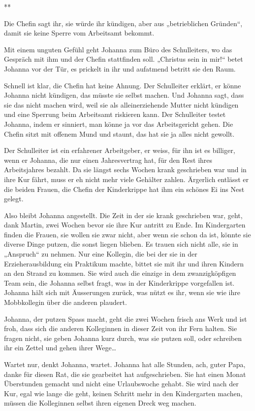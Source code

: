 \documentclass[10pt,titlepage,a5paper]{book}
\newcommand{\sterne}{\par{\centering ***\par}}
\begin{document}
\sterne

Die Chefin sagt ihr, sie würde ihr kündigen, aber aus „betrieblichen Gründen“, damit sie keine Sperre vom Arbeitsamt bekommt. 

Mit einem unguten Gefühl geht Johanna zum Büro des Schulleiters, wo das Gespräch mit ihm und der Chefin stattfinden soll. „Christus sein in mir!“ betet Johanna vor der Tür, es prickelt in ihr und aufatmend betritt sie den Raum.

Schnell ist klar, die Chefin hat keine Ahnung. Der Schulleiter erklärt, er könne Johanna nicht kündigen, das müsste sie selbst machen. Und Johanna  sagt, dass sie das nicht machen wird, weil sie als alleinerziehende Mutter nicht kündigen und eine Sperrung beim Arbeitsamt riskieren kann. Der Schulleiter testet Johanna, indem er sinniert, man könne ja vor das Arbeitsgericht gehen. Die Chefin sitzt mit offenem Mund und staunt, das hat sie ja alles nicht gewollt.

Der Schulleiter ist ein erfahrener Arbeitgeber, er weiss, für ihn ist es billiger, wenn er Johanna, die nur einen Jahresvertrag hat, für den Rest ihres Arbeitsjahres bezahlt. Da sie längst sechs Wochen krank geschrieben war und in ihre Kur fährt, muss er eh nicht mehr viele Gehälter zahlen. Ärgerlich entlässt er die beiden Frauen, die Chefin der Kinderkrippe hat ihm ein schönes Ei ins Nest gelegt. 

Also bleibt Johanna angestellt. Die Zeit in der sie krank geschrieben war, geht, dank Martin, zwei Wochen bevor sie ihre Kur antritt zu Ende. Im Kindergarten finden die Frauen, sie wollen sie zwar nicht, aber wenn sie schon da ist, könnte sie diverse Dinge putzen, die sonst liegen blieben. Es trauen sich nicht alle, sie in „Anspruch“ zu nehmen. Nur eine Kollegin, die bei der sie in der Erzieherausbildung ein Praktikum machte, bittet sie mit ihr und ihren Kindern an den Strand zu kommen. Sie wird auch die einzige in dem zwanzigköpfigen Team sein, die Johanna selbst fragt, was in der Kinderkrippe vorgefallen ist. Johanna hält sich mit Äusserungen zurück, was nützt es ihr, wenn sie wie ihre Mobbkollegin über die anderen plaudert.

Johanna, der putzen Spass macht, geht die zwei Wochen frisch ans Werk und ist froh, dass sich die anderen Kolleginnen in dieser Zeit von ihr Fern halten. Sie fragen nicht, sie geben Johanna kurz durch, was sie putzen soll, oder schreiben ihr ein Zettel und gehen ihrer Wege\dots 

Wartet nur, denkt Johanna, wartet. Johanna hat alle Stunden, ach, guter Papa, danke für diesen Rat, die sie gearbeitet hat aufgeschrieben. Sie hat einen Monat Überstunden gemacht und nicht eine Urlaubswoche gehabt. Sie wird nach der Kur, egal wie lange die geht, keinen Schritt mehr in den Kindergarten machen, müssen die Kolleginnen selbst ihren eigenen Dreck weg machen.
\end{document}
